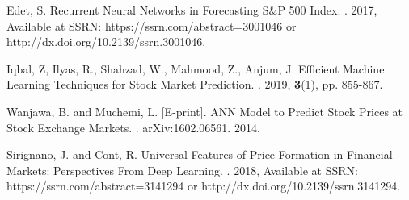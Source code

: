 \documentclass[11pt,a4paper]{article}
\numberwithin{equation}{section}
\begin{document}
\begin{thebibliography}{}
Edet, S.
\newblock Recurrent Neural Networks in Forecasting S\&P 500 Index.
. 2017, Available at SSRN: https://ssrn.com/abstract=3001046 or http://dx.doi.org/10.2139/ssrn.3001046.

Iqbal, Z, Ilyas, R., Shahzad, W., Mahmood, Z., Anjum, J.
\newblock Efficient Machine Learning Techniques for Stock Market Prediction.
. 2019, \textbf{3}(1), pp. 855-867.

Wanjawa, B. and Muchemi, L. [E-print].
\newblock ANN Model to Predict Stock Prices at Stock Exchange Markets.
. arXiv:1602.06561. 2014.

Sirignano, J. and Cont, R.
\newblock Universal Features of Price Formation in Financial Markets: Perspectives From Deep Learning.
. 2018, Available at SSRN: https://ssrn.com/abstract=3141294 or http://dx.doi.org/10.2139/ssrn.3141294.
\end{thebibliography}
\end{document}
